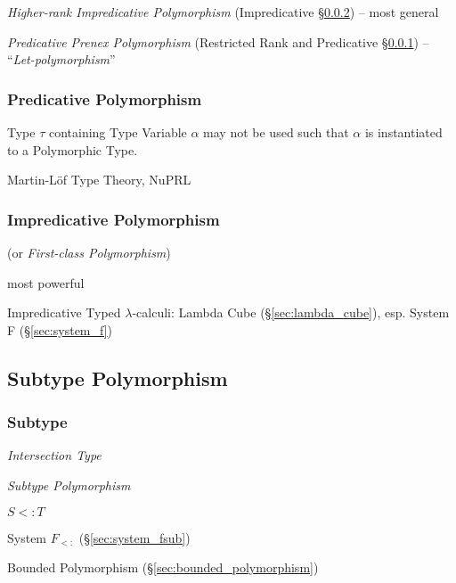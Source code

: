 \asterism


\emph{Higher-rank Impredicative Polymorphism} (Impredicative
\S\ref{sec:impredicative_polymorphism}) -- most general

\emph{Predicative Prenex Polymorphism} (Restricted Rank and
Predicative \S\ref{sec:predicative_polymorphism}) --
``\emph{Let-polymorphism}''



\subsubsection{Predicative Polymorphism}
\label{sec:predicative_polymorphism}

Type $\tau$ containing Type Variable $\alpha$ may not be used such
that $\alpha$ is instantiated to a Polymorphic Type.

Martin-L\"of Type Theory, NuPRL



\subsubsection{Impredicative Polymorphism}
\label{sec:impredicative_polymorphism}

(or \emph{First-class Polymorphism})

most powerful

Impredicative Typed $\lambda$-calculi: Lambda Cube
(\S\ref{sec:lambda_cube}), esp. System F (\S\ref{sec:system_f})



\subsection{Subtype Polymorphism}\label{sec:subtype_polymorphism}

\subsubsection{Subtype}\label{sec:subtype}

\emph{Intersection Type}

\emph{Subtype Polymorphism}

$S <: T$

System $F_{<:}$ (\S\ref{sec:system_fsub})

Bounded Polymorphism (\S\ref{sec:bounded_polymorphism})

